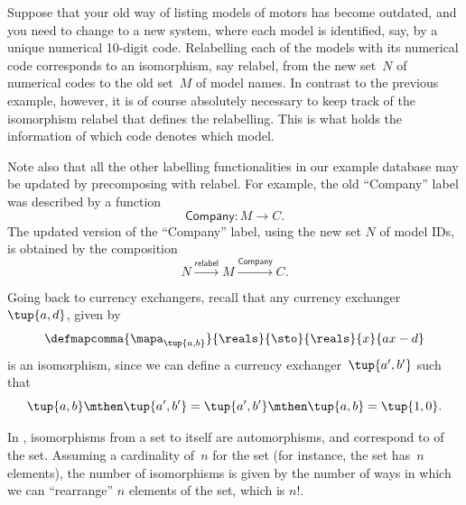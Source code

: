 \begin{example}[Relabelling]
\begin{table}[h]
        \caption{
            A simplified catalogue of motors.
        }
        \label{tab:electric_motors}
    \end{table}
    Suppose that your old way of listing models of motors has become outdated, and you need to change to a new system, where each model is identified, say, by a unique numerical 10-digit code.
    Relabelling each of the models with its numerical code corresponds to an isomorphism, say \textsf{relabel}, from the new set~$N$ of numerical codes to the old set~$M$ of model names.
    In contrast to the previous example, however, it is of course absolutely necessary to keep track of the isomorphism \textsf{relabel} that defines the relabelling.
    This is what holds the information of which code denotes which model.

    Note also that all the other labelling functionalities in our example database may be updated by precomposing with \textsf{relabel}.
    For example, the old ``Company'' label was described by a function
    \begin{equation}
        \textsf{Company}\colon M \to C.
    \end{equation}
    The updated version of the ``Company'' label, using the new set $N$ of model IDs, is obtained by the composition
    \begin{equation}
        N \overset{\textsf{relabel}}{\longrightarrow} M \overset{\textsf{Company}}{\longrightarrow} C.
    \end{equation}
\end{example}

\begin{example}
    Going back to currency exchangers, recall that any currency exchanger~$\tup{a,d}$, given by
    \begin{equation}
        \defmapcomma{
            \mapa_{\tup{a,b}}
        }{
            \reals
        }{
            \sto
        }{
            \reals
        }{
            x
        }{
            ax-d
        }
    \end{equation}
    is an isomorphism, since we can define a currency exchanger~$\tup{a',b'}$ such that
    \begin{equation}
        \tup{a,b}\mthen \tup{a',b'}=\tup{a',b'}\mthen \tup{a,b}=\tup{1,0}.
    \end{equation}
\end{example}

\begin{example}
    In \FinSet, isomorphisms from a set to itself are automorphisms, and correspond to  of the set.
    Assuming a cardinality of~$n$ for the set (for instance, the set has~$n$ elements), the number of isomorphisms is given by the number of ways in which we can ``rearrange'' $n$ elements of the set, which is $n!
    $.
\end{example}

